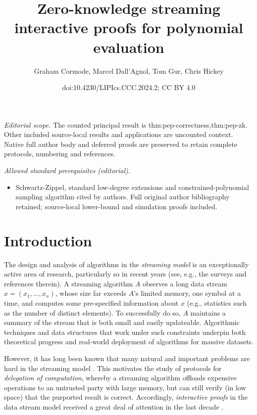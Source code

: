 \documentclass[10pt,a4paper]{article}
\title{Zero-knowledge streaming interactive proofs for polynomial evaluation}
\author{Graham Cormode, Marcel Dall'Agnol, Tom Gur, Chris Hickey}
\date{doi:10.4230/LIPIcs.CCC.2024.2; CC BY 4.0}
\theoremstyle{definition}
\begin{document}
\maketitle
\noindent\textit{Editorial scope.} The counted principal result is thm:pep-correctness,thm:pep-zk. Other included source-local results and applications are uncounted context. Native full author body and deferred proofs are preserved to retain complete protocols, numbering and references.\par\medskip
\noindent\textit{Allowed standard prerequisites (editorial).}\begin{itemize}
\item Schwartz-Zippel, standard low-degree extensions and constrained-polynomial sampling algorithm cited by authors. Full original author bibliography retained; source-local lower-bound and simulation proofs included.
\end{itemize}\medskip
\section{Introduction}
\label{sec:intro}

The design and analysis of algorithms in the \emph{streaming model} is an exceptionally active area of research, particularly so in recent years (see, e.g., the surveys \cite{M05, M14, C23} and references therein). A streaming algorithm $A$ observes a long data stream $x = (x_1, \ldots, x_n)$, whose size far exceeds $A$'s limited memory, one symbol at a time, and computes some pre-specified information about $x$ (e.g., statistics such as the number of distinct elements). To successfully do so, $A$ maintains a summary of the stream that is both small and easily updateable. Algorithmic techniques and data structures that work under such constraints underpin both theoretical progress and real-world deployment of algorithms for massive datasets.   

However, it has long been known that many natural and important problems are hard in the streaming model \cite{AMS99}. This motivates the study of protocols for \emph{delegation of computation}, whereby a streaming algorithm offloads expensive operations to an untrusted party with large memory, but can still verify (in low space) that the purported result is correct.  
Accordingly, \emph{interactive proofs} in the data stream model received a great deal of attention in the last decade \cite{CTY11, CMT12, CMT13, T13, CCGT14, T14, CCMTV15, DTV15, CH18, CG19, CGT20}.
\end{document}
